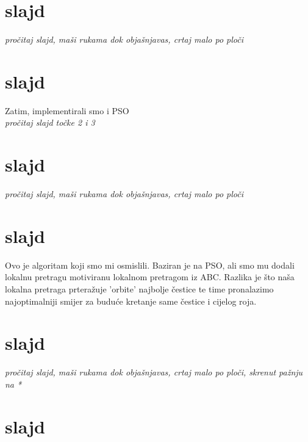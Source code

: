 \documentclass[a4paper,10pt]{article}
\begin{document}
\section{slajd}
\emph{pro\v citaj slajd, ma\v si rukama dok obja\v snjavas, crtaj malo po plo\v ci}

\section{slajd}
Zatim, implementirali smo i PSO\\
\emph{pro\v citaj slajd to\v cke 2 i 3}

\section{slajd}
\emph{pro\v citaj slajd, ma\v si rukama dok obja\v snjavas, crtaj malo po plo\v ci}

\section{slajd}
Ovo je algoritam koji smo mi osmislili. Baziran je na PSO, ali smo mu dodali lokalnu pretragu motiviranu lokalnom pretragom iz ABC. Razlika je \v sto na\v sa lokalna pretraga prtera\v zuje 'orbite' najbolje \v cestice te time pronalazimo najoptimalniji smijer za budu\' ce kretanje same \v cestice i cijelog roja.


\section{slajd}
\emph{pro\v citaj slajd, ma\v si rukama dok obja\v snjavas, crtaj malo po plo\v ci, skrenut pa\v znju na *}

\section{slajd}
\end{document}
